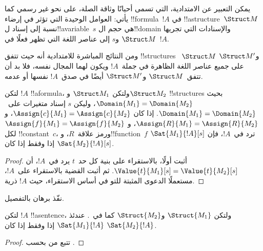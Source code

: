 \documentclass[../../../include/open-logic-section]{subfiles}
\begin{document}


\begin{explain}
يمكن التعبير عن الامتدادية، التي تسمى أحيانًا وثاقة الصلة، على نحو
غير رسمي كما يأتي: العوامل الوحيدة التي تؤثر في إرضاء
!!{formula}~$!A$ في !!a{structure}~$\Struct M$ نسبة إلى إسناد
ل!!a{variable}~$s$ هي حجم ال!!{domain} والإسنادات التي تجريها
$\Struct M$ و$s$ إلى عناصر اللغة التي تظهر فعلًا في~$!A$.

ومن النتائج المباشرة للامتدادية أنه حيث تتفق !!{structure}s
~$\Struct M$ و$\Struct M'$ على جميع عناصر اللغة الظاهرة في
جملة~$!A$ ويكون لهما المجال نفسه، فلا بد أن تتفق~$\Struct M$
و$\Struct M'$ أيضًا في صدق~$!A$ نفسها أو عدمه.
\end{explain}

\begin{prop}[الامتدادية]
  لتكن $!A$ !!a{formula}، ولتكن $\Struct M_1$ و$\Struct M_2$
  !!{structure}s بحيث $\Domain{M_1} = \Domain{M_2}$، وليكن $s$
  إسناد متغيرات على~$\Domain{M_1} = \Domain{M_2}$. إذا كان
  $\Assign{c}{M_1} = \Assign{c}{M_2}$،
  و$\Assign{R}{M_1}=\Assign{R}{M_2}$، و
  $\Assign{f}{M_1} = \Assign{f}{M_2}$ لكل !!{constant}~$c$،
  ورمز علاقة~$R$، و!!{function}~$f$ ترد في~$!A$، فإن
  $\Sat{M_1}{!A}[s]$ إذا وفقط إذا كان $\Sat{M_2}{!A}[s]$.
\end{prop}

\begin{proof}
  أثبت أولًا، بالاستقراء على بنية كل حد~$t$ يرد في~$!A$، أن
  $\Value{t}{M_1}[s] = \Value{t}{M_2}[s]$. ثم أثبت القضية بالاستقراء
  على~$!A$، مستعملًا الدعوى المثبتة للتو في أساس الاستقراء، حيث $!A$ ذرية.
\end{proof}

\begin{prob}
نفّذ برهان  بالتفصيل.
\end{prob}

\begin{cor}
  لتكن $!A$ !!a{sentence}، ولتكن $\Struct{M_1}$ و$\Struct{M_2}$ كما
  في~. عندئذ
  $\Sat{M_1}{!A}$ إذا وفقط إذا كان $\Sat{M_2}{!A}$.
\end{cor}

\begin{proof}
تتبع من  بحسب
.
\end{proof}
\end{document}

